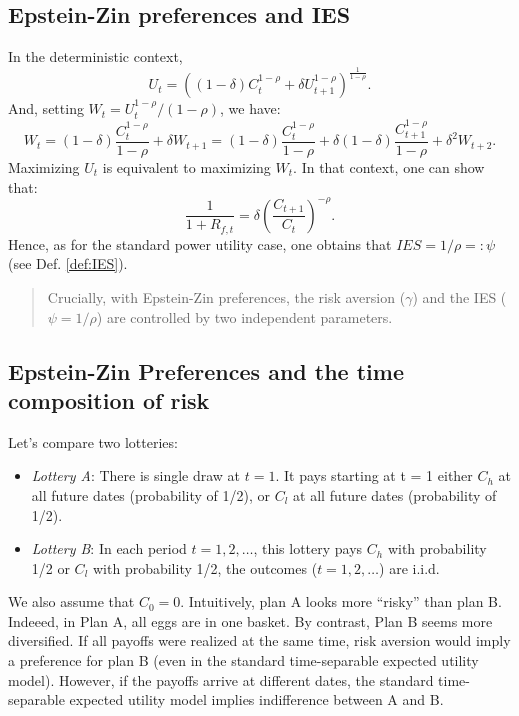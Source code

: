 \documentclass[
  12pt,
]{book}
\providecommand{\tightlist}{%
  \setlength{\itemsep}{0pt}\setlength{\parskip}{0pt}}
\theoremstyle{definition}
\theoremstyle{definition}
\theoremstyle{definition}
\theoremstyle{definition}
\theoremstyle{remark}
\begin{document}
\hypertarget{epstein-zin-preferences-and-ies}{%
\subsection{Epstein-Zin preferences and IES}\label{epstein-zin-preferences-and-ies}}

In the deterministic context,
\[
U_t = \left((1-\delta)C_t^{1-\rho} + \delta U_{t+1}^{1-\rho}\right)^{\frac{1}{1-\rho}}.
\]
And, setting \(W_t = U_t^{1-\rho}/(1-\rho)\), we have:
\[
W_t = (1-\delta)\frac{C_t^{1-\rho}}{1-\rho} + \delta W_{t+1} = (1-\delta)\frac{C_t^{1-\rho}}{1-\rho} + \delta(1-\delta)\frac{C_{t+1}^{1-\rho}}{1-\rho} + \delta^2 W_{t+2}.
\]
Maximizing \(U_t\) is equivalent to maximizing \(W_t\). In that context, one can show that:
\[
\frac{1}{1+ R_{f,t}}=\delta \left(\frac{C_{t+1}}{C_t}\right)^{-\rho}.
\]
Hence, as for the standard power utility case, one obtains that \(IES = 1/\rho =: \psi\) (see Def. \ref{def:IES}).

\begin{quote}
Crucially, with Epstein-Zin preferences, the risk aversion (\(\gamma\)) and the IES (\(\psi=1/\rho\)) are controlled by two independent parameters.
\end{quote}

\hypertarget{epstein-zin-preferences-and-the-time-composition-of-risk}{%
\subsection{Epstein-Zin Preferences and the time composition of risk}\label{epstein-zin-preferences-and-the-time-composition-of-risk}}

Let's compare two lotteries:

\begin{itemize}
\tightlist
\item
  \emph{Lottery A}: There is single draw at \(t=1\). It pays starting at t = 1 either \(C_h\) at all future dates (probability of 1/2), or \(C_l\) at all future dates (probability of 1/2).
\item
  \emph{Lottery B}: In each period \(t = 1, 2, \dots\), this lottery pays \(C_h\) with probability 1/2 or \(C_l\) with probability 1/2, the outcomes (\(t = 1, 2, \dots\)) are i.i.d.
\end{itemize}

We also assume that \(C_0=0\). Intuitively, plan A looks more ``risky'' than plan B. Indeeed, in Plan A, all eggs are in one basket. By contrast, Plan B seems more diversified.
If all payoffs were realized at the same time, risk aversion would imply a preference for plan B (even in the standard time-separable expected utility model).
However, if the payoffs arrive at different dates, the standard time-separable expected utility model implies indifference between A and B.
\end{document}
